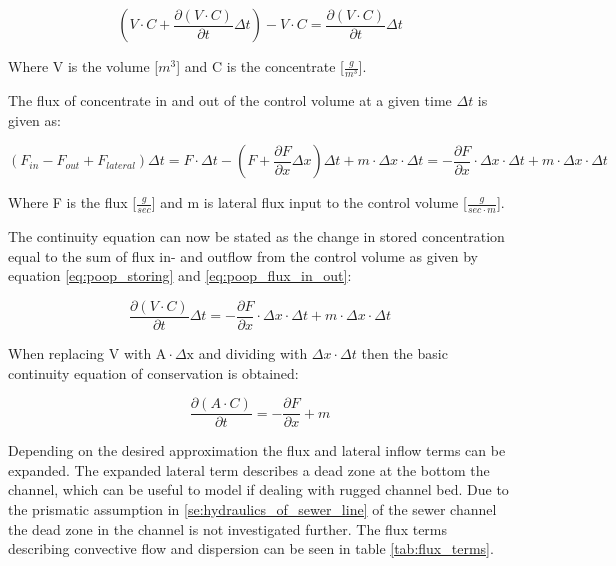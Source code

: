 \begin{equation}
 \left(V \cdot C + \frac{\partial (V\cdot C)}{\partial t} \Delta t \right) - V\cdot C = \frac{\partial (V\cdot C)}{\partial t}\Delta t
\label{eq:poop_storing}
\end{equation}

Where V is the volume [$m^3$] and C is the concentrate [$\frac{g}{m^3}$]. 

The flux of concentrate in and out of the control volume at a given time $\Delta t$ is given as:


 \begin{equation}
  	\left( F_{in} - F_{out} + F_{lateral} \right) \Delta t   =	F \cdot \Delta t - \left(F + \frac{\partial F}{\partial x}\Delta x \right) \Delta t + m \cdot \Delta x \cdot \Delta t = - \frac{\partial F}{\partial x}\cdot \Delta x \cdot \Delta t +m \cdot \Delta x \cdot \Delta t  
  \label{eq:poop_flux_in_out}
  \end{equation} 



Where F is the flux [$\frac{g}{sec}$] and m is lateral flux input to the control volume [$\frac{g}{sec\cdot m}$].

The continuity equation can now be stated as the change in stored concentration equal to the sum of flux in- and outflow from the control volume as given by equation \ref{eq:poop_storing} and \ref{eq:poop_flux_in_out}:

\begin{equation}
	\frac{\partial (V\cdot C)}{\partial t}\Delta t = - \frac{\partial F}{\partial x}\cdot \Delta x \cdot \Delta t +m \cdot \Delta x \cdot \Delta t
\end{equation}

When replacing V with $\text{A}\cdot \Delta \text{x}$ and dividing with $\Delta x \cdot  \Delta t$ then the basic continuity equation of conservation is obtained:

\begin{equation}
	\frac{\partial (A\cdot C)}{\partial t} = - \frac{\partial F}{\partial x} + m 
\label{eq:concentrate_continuity_equation}
\end{equation}

Depending on the desired approximation the flux and lateral inflow terms can be expanded. The expanded lateral term describes a dead zone at the bottom the channel, which can be useful to model if dealing with rugged channel bed. Due to the prismatic assumption in \ref{se:hydraulics_of_sewer_line} of the sewer channel the dead zone in the channel is not investigated further. The flux terms describing convective flow and dispersion can be seen in table \ref{tab:flux_terms}.  

